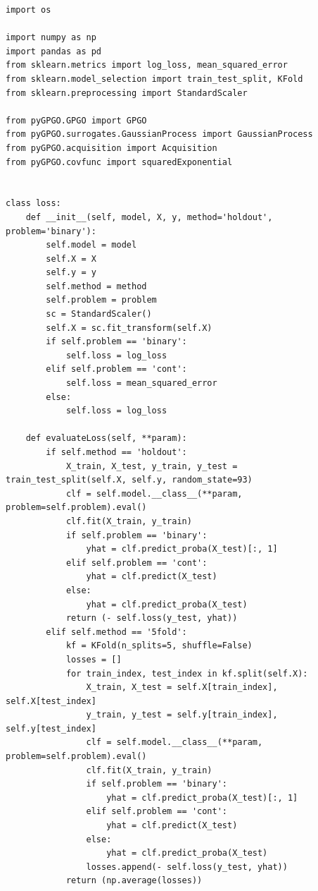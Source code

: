 \documentclass[10pt,a4paper,twoside]{book}
\begin{document}
\begin{appendices}
\begin{verbatim}
import os

import numpy as np
import pandas as pd
from sklearn.metrics import log_loss, mean_squared_error
from sklearn.model_selection import train_test_split, KFold
from sklearn.preprocessing import StandardScaler

from pyGPGO.GPGO import GPGO
from pyGPGO.surrogates.GaussianProcess import GaussianProcess
from pyGPGO.acquisition import Acquisition
from pyGPGO.covfunc import squaredExponential


class loss:
    def __init__(self, model, X, y, method='holdout', problem='binary'):
        self.model = model
        self.X = X
        self.y = y
        self.method = method
        self.problem = problem
        sc = StandardScaler()
        self.X = sc.fit_transform(self.X)
        if self.problem == 'binary':
            self.loss = log_loss
        elif self.problem == 'cont':
            self.loss = mean_squared_error
        else:
            self.loss = log_loss

    def evaluateLoss(self, **param):
        if self.method == 'holdout':
            X_train, X_test, y_train, y_test = train_test_split(self.X, self.y, random_state=93)
            clf = self.model.__class__(**param, problem=self.problem).eval()
            clf.fit(X_train, y_train)
            if self.problem == 'binary':
                yhat = clf.predict_proba(X_test)[:, 1]
            elif self.problem == 'cont':
                yhat = clf.predict(X_test)
            else:
                yhat = clf.predict_proba(X_test)
            return (- self.loss(y_test, yhat))
        elif self.method == '5fold':
            kf = KFold(n_splits=5, shuffle=False)
            losses = []
            for train_index, test_index in kf.split(self.X):
                X_train, X_test = self.X[train_index], self.X[test_index]
                y_train, y_test = self.y[train_index], self.y[test_index]
                clf = self.model.__class__(**param, problem=self.problem).eval()
                clf.fit(X_train, y_train)
                if self.problem == 'binary':
                    yhat = clf.predict_proba(X_test)[:, 1]
                elif self.problem == 'cont':
                    yhat = clf.predict(X_test)
                else:
                    yhat = clf.predict_proba(X_test)
                losses.append(- self.loss(y_test, yhat))
            return (np.average(losses))



\end{verbatim}
\end{appendices}
\end{document}
